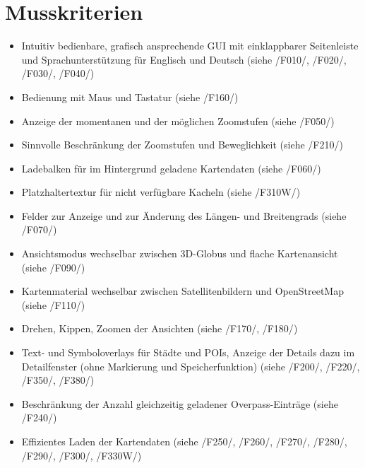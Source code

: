 \documentclass[10pt]{scrreprt}
\newcommand{\ziel}[1]{{\fontsize{9.5}{11}\textsf{/#1/}}}
\begin{document}
\section{Musskriterien}
\begin{itemize}
\item Intuitiv bedienbare, grafisch ansprechende GUI mit einklappbarer Seitenleiste und Sprachunterstützung für Englisch und Deutsch (siehe \ziel{F010}, \ziel{F020}, \ziel{F030}, \ziel{F040})
\item Bedienung mit Maus und Tastatur (siehe \ziel{F160})
\item Anzeige der momentanen und der möglichen Zoomstufen (siehe \ziel{F050})
\item Sinnvolle Beschränkung der Zoomstufen und Beweglichkeit (siehe \ziel{F210})
\item Ladebalken für im Hintergrund geladene Kartendaten (siehe \ziel{F060})
\item Platzhaltertextur für nicht verfügbare Kacheln (siehe \ziel{F310W})
\item Felder zur Anzeige und zur Änderung des Längen- und Breitengrads (siehe \ziel{F070})
\item Ansichtsmodus wechselbar zwischen 3D-Globus und flache Kartenansicht (siehe \ziel{F090})
\item Kartenmaterial wechselbar zwischen Satellitenbildern und OpenStreetMap (siehe \ziel{F110})
\item Drehen, Kippen, Zoomen der Ansichten (siehe \ziel{F170}, \ziel{F180})
\item Text- und Symboloverlays für Städte und POIs, Anzeige der Details dazu im Detailfenster (ohne Markierung und Speicherfunktion) (siehe \ziel{F200}, \ziel{F220}, \ziel{F350}, \ziel{F380})
\item Beschränkung der Anzahl gleichzeitig geladener Overpass-Einträge (siehe \ziel{F240})
\item Effizientes Laden der Kartendaten (siehe \ziel{F250}, \ziel{F260}, \ziel{F270}, \ziel{F280}, \ziel{F290}, \ziel{F300}, \ziel{F330W})
\end{itemize}
\end{document}
